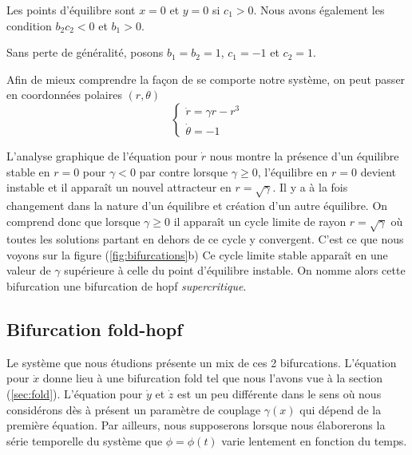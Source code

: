 Les points d'équilibre sont $x = 0$ et $y = 0$ si $c_1 > 0$. Nous avons également les condition $b_2c_2 < 0$ et $b_1 > 0$.

Sans perte de généralité, posons $b_1 = b_2 = 1$, $c_1 = -1$ et $c_2 = 1$.


Afin de mieux comprendre la façon de se comporte notre système, on peut passer en coordonnées polaires $(r, \theta)$
\begin{equation}
  \begin{cases}
    \dot{r} = \gamma r - r^3 \\
    \dot{\theta} = -1
  \end{cases}
\end{equation}

L'analyse graphique de l'équation pour $\dot{r}$ nous montre la présence d'un équilibre stable en $r = 0$ pour $\gamma < 0$ par contre lorsque $\gamma \geq 0$, l'équilibre en $r = 0$ devient instable et il apparaît un nouvel attracteur en $r = \sqrt{\gamma}$. Il y a à la fois changement dans la nature d'un équilibre et création d'un autre équilibre. On comprend donc que lorsque $\gamma \geq 0$ il apparaît un cycle limite de rayon $r = \sqrt{\gamma}$ où toutes les solutions partant en dehors de ce cycle y convergent. C'est ce que nous voyons sur la figure (\ref{fig:bifurcations}b) Ce cycle limite stable apparaît en une valeur de $\gamma$ supérieure à celle du point d'équilibre instable. On nomme alors cette bifurcation une bifurcation de hopf \emph{supercritique}.

\subsection{Bifurcation fold-hopf}

Le système que nous étudions présente un mix de ces 2 bifurcations. L'équation pour $\dot{x}$ donne lieu à une bifurcation fold tel que nous l'avons vue à la section (\ref{sec:fold}). L'équation pour $\dot{y}$ et $\dot{z}$ est un peu différente dans le sens où nous considérons dès à présent un paramètre de couplage $\gamma(x)$ qui dépend de la première équation. Par ailleurs, nous supposerons lorsque nous élaborerons la série temporelle du système que $\phi = \phi(t)$ varie lentement en fonction du temps.

